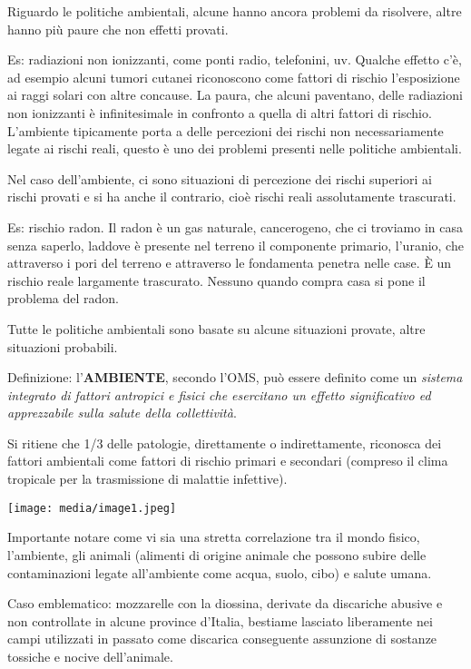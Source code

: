 \documentclass[]{article}
\begin{document}
Riguardo le politiche ambientali, alcune hanno ancora problemi da
risolvere, altre hanno più paure che non effetti provati.

Es: radiazioni non ionizzanti, come ponti radio, telefonini, uv. Qualche
effetto c'è, ad esempio alcuni tumori cutanei riconoscono come fattori
di rischio l'esposizione ai raggi solari con altre concause. La paura,
che alcuni paventano, delle radiazioni non ionizzanti è infinitesimale
in confronto a quella di altri fattori di rischio. L'ambiente
tipicamente porta a delle percezioni dei rischi non necessariamente
legate ai rischi reali, questo è uno dei problemi presenti nelle
politiche ambientali.

Nel caso dell'ambiente, ci sono situazioni di percezione dei rischi
superiori ai rischi provati e si ha anche il contrario, cioè rischi
reali assolutamente trascurati.

Es: rischio radon. Il radon è un gas naturale, cancerogeno, che ci
troviamo in casa senza saperlo, laddove è presente nel terreno il
componente primario, l'uranio, che attraverso i pori del terreno e
attraverso le fondamenta penetra nelle case. È un rischio reale
largamente trascurato. Nessuno quando compra casa si pone il problema
del radon.

Tutte le politiche ambientali sono basate su alcune situazioni provate,
altre situazioni probabili.

Definizione: l'\textbf{AMBIENTE}, secondo l'OMS, può essere definito
come un \emph{sistema integrato di fattori antropici e fisici che
esercitano un effetto significativo ed apprezzabile sulla salute della
collettività}.

Si ritiene che 1/3 delle patologie, direttamente o indirettamente,
riconosca dei fattori ambientali come fattori di rischio primari e
secondari (compreso il clima tropicale per la trasmissione di malattie
infettive).

\texttt{[image: media/image1.jpeg]}

Importante notare come vi sia una stretta correlazione tra il mondo
fisico, l'ambiente, gli animali (alimenti di origine animale che possono
subire delle contaminazioni legate all'ambiente come acqua, suolo, cibo)
e salute umana.

Caso emblematico: mozzarelle con la diossina, derivate da discariche
abusive e non controllate in alcune province d'Italia, bestiame lasciato
liberamente nei campi utilizzati in passato come discarica conseguente
assunzione di sostanze tossiche e nocive dell'animale.
\end{document}

